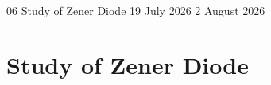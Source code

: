\begin{refsection}

  \GenerateCoverPage
  {06} %
  {Study of Zener Diode} %
  {19 July 2026} %
  {2 August 2026} %

  \chapter{Study of Zener Diode}

  
  
  
  
  
  
  
  
  
  
  

\end{refsection}
